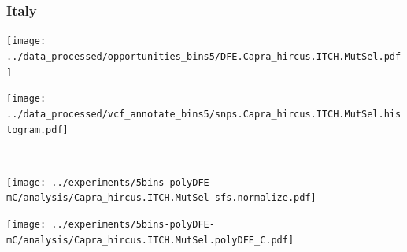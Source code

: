 \subsubsection{Italy}

\begin{minipage}{0.49\linewidth}
    \texttt{[image: ../data\_processed/opportunities\_bins5/DFE.Capra\_hircus.ITCH.MutSel.pdf]}
\end{minipage}
\begin{minipage}{0.49\linewidth}
    \texttt{[image: ../data\_processed/vcf\_annotate\_bins5/snps.Capra\_hircus.ITCH.MutSel.histogram.pdf]}
\end{minipage}
\\
\begin{minipage}{0.49\linewidth}
    \texttt{[image: ../experiments/5bins-polyDFE-mC/analysis/Capra\_hircus.ITCH.MutSel-sfs.normalize.pdf]}
\end{minipage}
\begin{minipage}{0.4\linewidth}
    \texttt{[image: ../experiments/5bins-polyDFE-mC/analysis/Capra\_hircus.ITCH.MutSel.polyDFE\_C.pdf]}
\end{minipage}
